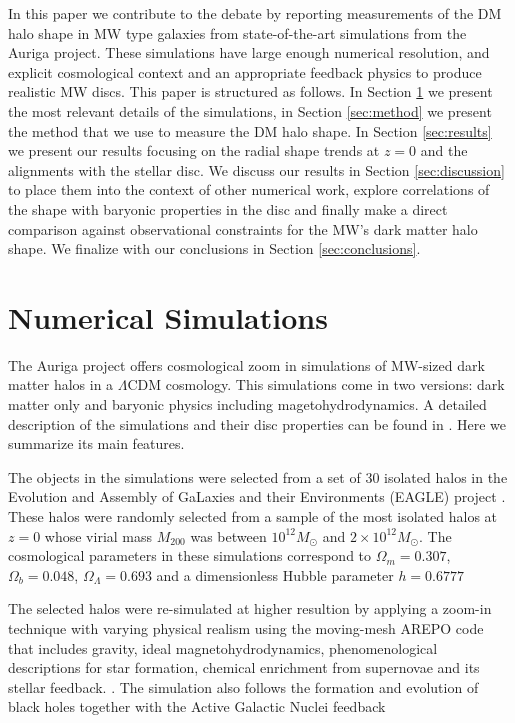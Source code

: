 \documentclass[usenatbib]{mnras}
\begin{document}
In this paper we contribute to the debate by reporting measurements of
the DM halo shape in MW type galaxies from state-of-the-art simulations from the
Auriga project.
These simulations have large enough numerical resolution, and explicit
cosmological context and an appropriate feedback physics to produce
realistic MW discs.
This paper is structured as follows. 
In Section \ref{sec:numerical} we present the most relevant details of
the simulations, in Section \ref{sec:method} we present the method
that we use to measure the DM halo shape. 
In Section \ref{sec:results} we present our results focusing on the
radial shape trends at $z=0$ and the alignments with the stellar disc.
We discuss our results in Section \ref{sec:discussion} to place them
into the context of other numerical work, explore correlations of the
shape with baryonic properties in the disc and finally make a direct
comparison against observational constraints for the MW's dark matter halo shape.
We finalize with our conclusions in Section \ref{sec:conclusions}.


\section{Numerical Simulations}
\label{sec:numerical}

The Auriga project offers cosmological zoom in simulations of MW-sized 
dark matter halos in a $\Lambda$CDM cosmology. 
This simulations come in two versions: dark matter only and
baryonic physics including magetohydrodynamics.
A detailed description of the simulations and their disc properties
can be found in \citep{auriga}.
Here we summarize its main features.

The objects in the simulations were selected from a set of 30
isolated halos in the Evolution and Assembly of GaLaxies and their
Environments (EAGLE)  project \citep{Eagle}.   
These halos were randomly selected from a sample of the most isolated
halos at $z=0$ whose virial mass $M_{200}$ was between $10^{12}M_\odot$ and
$2\times 10^{12}M_\odot$. 
The cosmological parameters in these simulations correspond to
$\Omega_m=0.307$, $\Omega_b=0.048$, $\Omega_\Lambda=0.693$ and a
dimensionless Hubble parameter $h=0.6777$ \citep{2014A&A...571A..16P}

The selected halos were re-simulated at higher resultion by applying a
zoom-in technique with varying physical realism using the moving-mesh AREPO code
that includes gravity, ideal magnetohydrodynamics,  phenomenological
descriptions for star formation, chemical enrichment from supernovae
and its stellar feedback.   
\citep{arepo,2013MNRAS.432..176P}.
The simulation also follows the formation and evolution of black holes
together with the Active Galactic Nuclei feedback
\end{document}
